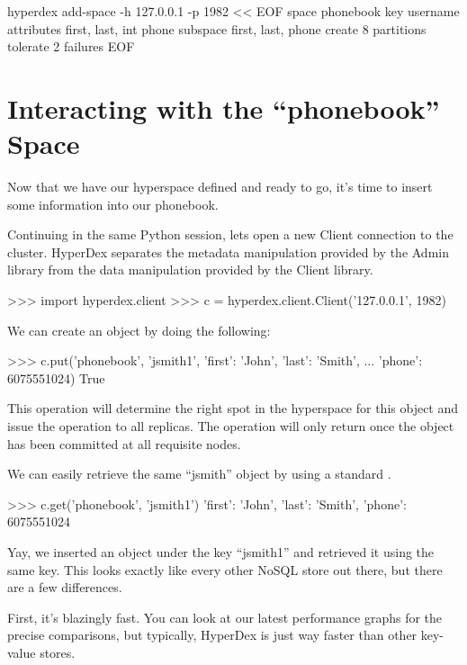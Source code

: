 \begin{consolecode}
hyperdex add-space -h 127.0.0.1 -p 1982 << EOF
   space phonebook
   key username
   attributes first, last, int phone
   subspace first, last, phone
   create 8 partitions
   tolerate 2 failures
EOF
\end{consolecode}

\section{Interacting with the ``phonebook'' Space}

Now that we have our hyperspace defined and ready to go, it's time to insert
some information into our phonebook.

Continuing in the same Python session, lets open a new Client connection to the
cluster.  HyperDex separates the metadata manipulation provided by the Admin
library from the data manipulation provided by the Client library.

\begin{pythoncode}
>>> import hyperdex.client
>>> c = hyperdex.client.Client('127.0.0.1', 1982)
\end{pythoncode}

We can create an object by doing the following:

\begin{pythoncode}
>>> c.put('phonebook', 'jsmith1', {'first': 'John', 'last': 'Smith',
...                                'phone': 6075551024})
True
\end{pythoncode}

This operation will determine the right spot in the hyperspace for this object
and issue the  operation to all replicas.  The operation will only
return once the object has been committed at all requisite nodes.

We can easily retrieve the same ``jsmith'' object by using a standard
.

\begin{pythoncode}
>>> c.get('phonebook', 'jsmith1')
{'first': 'John', 'last': 'Smith', 'phone': 6075551024}
\end{pythoncode}

Yay, we inserted an object under the key ``jsmith1'' and retrieved it using the
same key.  This looks exactly like every other NoSQL store out there, but there
are a few differences.

First, it's blazingly fast. You can look at our latest performance graphs for
the precise comparisons, but typically, HyperDex is just way faster than other
key-value stores.

